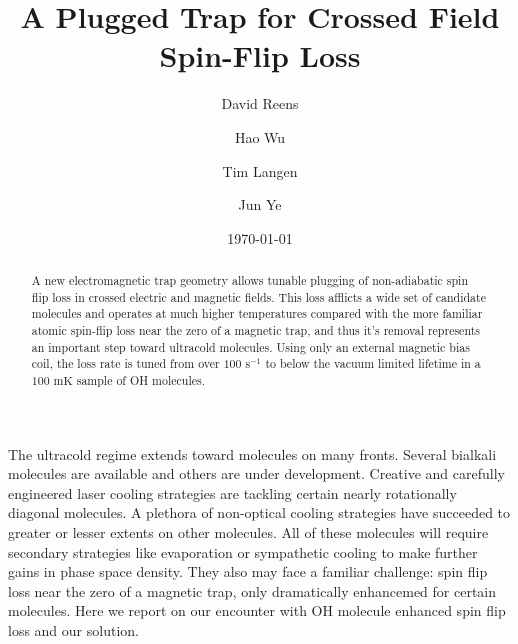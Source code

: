 \documentclass[%
 reprint,
 amsmath,amssymb,
 aps,
prl,
]{revtex4-1}
\begin{document}

\title{A Plugged Trap for Crossed Field Spin-Flip Loss}%


\author{David Reens}%
\author{Hao Wu}
\author{Tim Langen}%
\author{Jun Ye}
%

\date{\today}%


\begin{abstract}
A new electromagnetic trap geometry allows tunable plugging of non-adiabatic spin flip loss in crossed electric and magnetic fields. This loss afflicts a wide set of candidate molecules and operates at much higher temperatures compared with the more familiar atomic spin-flip loss near the zero of a magnetic trap, and thus it's removal represents an important step toward ultracold molecules. Using only an external magnetic bias coil, the loss rate is tuned from over $100 \text{ s}^{-1} $ to below the vacuum limited lifetime in a $100 \text{ mK}$ sample of OH molecules.
\end{abstract}


\maketitle


%
%
The ultracold regime extends toward molecules on many fronts. Several bialkali molecules are available and others are under development. Creative and carefully engineered laser cooling strategies are tackling certain nearly rotationally diagonal molecules. A plethora of non-optical cooling strategies have succeeded to greater or lesser extents on other molecules. All of these molecules will require secondary strategies like evaporation or sympathetic cooling to make further gains in phase space density. They also may face a familiar challenge: spin flip loss near the zero of a magnetic trap, only dramatically enhancemed for certain molecules. Here we report on our encounter with OH molecule enhanced spin flip loss and our solution.
\end{document}
